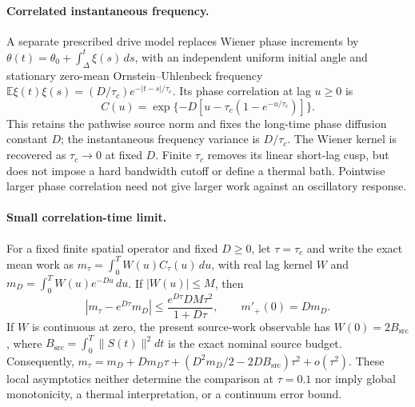 \paragraph{Correlated instantaneous frequency.}
A separate prescribed drive model replaces Wiener phase increments by
$\theta(t)=\theta_0+\int_\Delta^t\xi(s)\,ds$, with an independent uniform
initial angle and stationary zero-mean Ornstein--Uhlenbeck frequency
$\mathbb E\xi(t)\xi(s)=(D/\tau_c)e^{-|t-s|/\tau_c}$.
Its phase correlation at lag $u\ge0$ is
\[
 C(u)=\exp\{-D[u-\tau_c(1-e^{-u/\tau_c})]\}.
\]
This retains the pathwise source norm and fixes the long-time phase
diffusion constant $D$; the instantaneous frequency variance is
$D/\tau_c$. The Wiener kernel is recovered as $\tau_c\to0$ at fixed $D$.
Finite $\tau_c$ removes its linear short-lag cusp, but does not impose a
hard bandwidth cutoff or define a thermal bath. Pointwise larger phase
correlation need not give larger work against an oscillatory response.

\paragraph{Small correlation-time limit.}
For a fixed finite spatial operator and fixed $D\geq0$, let $\tau=\tau_c$ and write the exact mean work as
$m_\tau=\int_0^T W(u)C_\tau(u)\,du$, with real lag kernel $W$ and
$m_D=\int_0^T W(u)e^{-Du}\,du$. If $|W(u)|\leq M$, then
\[
 |m_\tau-e^{D\tau}m_D|\leq
 \frac{e^{D\tau}DM\tau^2}{1+D\tau},\qquad m'_+(0)=Dm_D.
\]
If $W$ is continuous at zero, the present source-work observable has
$W(0)=2B_{\mathrm{src}}$, where $B_{\mathrm{src}}=\int_0^T\|S(t)\|^2dt$ is the exact
nominal source budget. Consequently,
$m_\tau=m_D+Dm_D\tau+(D^2m_D/2-2DB_{\mathrm{src}})\tau^2+o(\tau^2)$.
These local asymptotics neither determine the comparison at $\tau=0.1$
nor imply global monotonicity, a thermal interpretation, or a continuum error bound.

